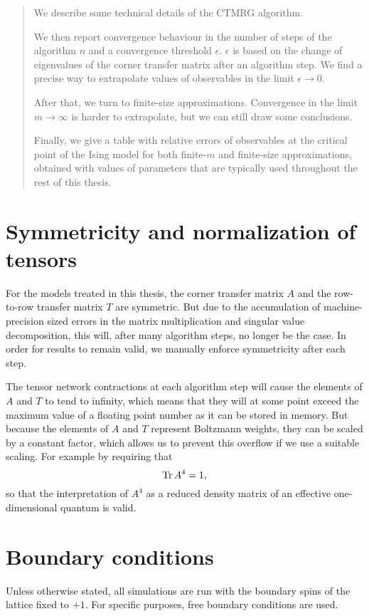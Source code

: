 \begin{abstract}
\noindent We describe some technical details of the CTMRG algorithm.

We then report convergence behaviour in the number of steps of the algorithm $n$ and a convergence threshold
$\epsilon$. $\epsilon$ is based on the change of eigenvalues of the corner transfer matrix after an algorithm step.
We find a precise way to extrapolate values of observables in the limit $\epsilon \to 0$.

After that, we turn to finite-size approximations.
Convergence in the limit $m \to \infty$ is harder to extrapolate, but we can still draw some conclusions.

Finally, we give a table with relative errors of observables at the critical point of the Ising model for both
finite-$m$ and finite-size approximations, obtained with values of parameters that are typically used throughout the
rest of this thesis.
\end{abstract}

\section{Symmetricity and normalization of tensors}
For the models treated in this thesis, the corner transfer matrix $A$ and the row-to-row transfer matrix $T$ are
symmetric. But due to the accumulation of machine-precision sized errors in the matrix multiplication and singular value
decomposition, this will, after many algorithm steps, no longer be the case. In order for results to remain valid, we
manually enforce symmetricity after each step.

The tensor network contractions at each algorithm step will cause the elements of $A$ and $T$ to tend to infinity, which
means that they will at some point exceed the maximum value of a floating point number as it can be stored in memory.
But because the elements of $A$ and $T$ represent Boltzmann weights, they can be scaled by a constant factor, which
allows us to prevent this overflow if we use a suitable scaling. For example by requiring that
\begin{equation}
  \operatorname{Tr} A^4 = 1,
\end{equation}
so that the interpretation of $A^4$ as a reduced density matrix of an effective one-dimensional quantum is valid.

\section{Boundary conditions}
Unless otherwise stated, all simulations are run with the boundary spins of the lattice fixed to $+1$.
For specific purposes, free boundary conditions are used.

